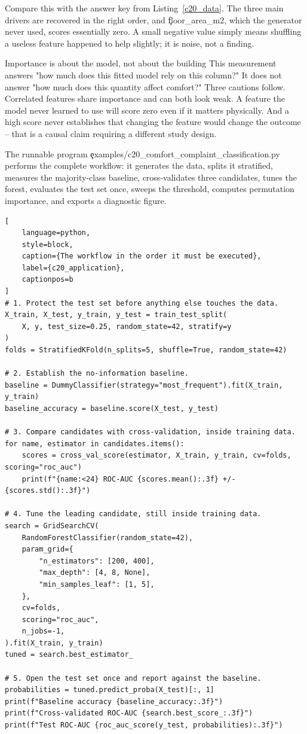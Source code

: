 Compare this with the answer key from Listing~\ref{c20_data}. The three main
drivers are recovered in the right order, and \c{floor_area_m2}, which the
generator never used, scores essentially zero. A small negative value simply
means shuffling a useless feature happened to help slightly; it is noise, not a
finding.

\begin{ExplainBox}{Importance is about the model, not about the building}
This measurement answers "how much does this fitted model rely on this column?"
It does not answer "how much does this quantity affect comfort?" Three cautions
follow. Correlated features share importance and can both look weak. A feature
the model never learned to use will score zero even if it matters physically.
And a high score never establishes that changing the feature would change the
outcome -- that is a causal claim requiring a different study design.
\end{ExplainBox}

\label{sec:c20-application}

The runnable program \c{examples/c20_comfort_complaint_classification.py}
performs the complete workflow: it generates the data, splits it stratified,
measures the majority-class baseline, cross-validates three candidates, tunes
the forest, evaluates the test set once, sweeps the threshold, computes
permutation importance, and exports a diagnostic figure.

\begin{lstlisting}[
    language=python,
    style=block,
    caption={The workflow in the order it must be executed},
    label={c20_application},
    captionpos=b
]
# 1. Protect the test set before anything else touches the data.
X_train, X_test, y_train, y_test = train_test_split(
    X, y, test_size=0.25, random_state=42, stratify=y
)
folds = StratifiedKFold(n_splits=5, shuffle=True, random_state=42)

# 2. Establish the no-information baseline.
baseline = DummyClassifier(strategy="most_frequent").fit(X_train, y_train)
baseline_accuracy = baseline.score(X_test, y_test)

# 3. Compare candidates with cross-validation, inside training data.
for name, estimator in candidates.items():
    scores = cross_val_score(estimator, X_train, y_train, cv=folds, scoring="roc_auc")
    print(f"{name:<24} ROC-AUC {scores.mean():.3f} +/- {scores.std():.3f}")

# 4. Tune the leading candidate, still inside training data.
search = GridSearchCV(
    RandomForestClassifier(random_state=42),
    param_grid={
        "n_estimators": [200, 400],
        "max_depth": [4, 8, None],
        "min_samples_leaf": [1, 5],
    },
    cv=folds,
    scoring="roc_auc",
    n_jobs=-1,
).fit(X_train, y_train)
tuned = search.best_estimator_

# 5. Open the test set once and report against the baseline.
probabilities = tuned.predict_proba(X_test)[:, 1]
print(f"Baseline accuracy {baseline_accuracy:.3f}")
print(f"Cross-validated ROC-AUC {search.best_score_:.3f}")
print(f"Test ROC-AUC {roc_auc_score(y_test, probabilities):.3f}")
\end{lstlisting}

